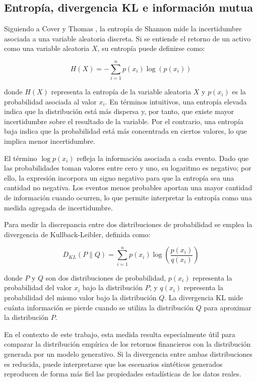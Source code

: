 \subsection{Entropía, divergencia KL e información mutua}

Siguiendo a Cover y Thomas \citeyear{cover2006elements}, la entropía de Shannon mide la incertidumbre asociada a una variable aleatoria discreta. Si se entiende el retorno de un activo como una variable aleatoria $X$, su entropía puede definirse como:

\begin{equation}
H(X) = - \sum_{i=1}^{n} p(x_i)\log\left(p(x_i)\right)
\end{equation}

donde $H(X)$ representa la entropía de la variable aleatoria $X$ y $p(x_i)$ es la probabilidad asociada al valor $x_i$. En términos intuitivos, una entropía elevada indica que la distribución está más dispersa y, por tanto, que existe mayor incertidumbre sobre el resultado de la variable. Por el contrario, una entropía baja indica que la probabilidad está más concentrada en ciertos valores, lo que implica menor incertidumbre.

El término $\log p(x_i)$ refleja la información asociada a cada evento. Dado que las probabilidades toman valores entre cero y uno, su logaritmo es negativo; por ello, la expresión incorpora un signo negativo para que la entropía sea una cantidad no negativa. Los eventos menos probables aportan una mayor cantidad de información cuando ocurren, lo que permite interpretar la entropía como una medida agregada de incertidumbre.

Para medir la discrepancia entre dos distribuciones de probabilidad se emplea la divergencia de Kullback-Leibler, definida como:

\begin{equation}
D_{KL}(P \parallel Q)
=
\sum_{i=1}^{n} p(x_i)
\log\left(
\frac{p(x_i)}{q(x_i)}
\right)
\end{equation}

donde $P$ y $Q$ son dos distribuciones de probabilidad, $p(x_i)$ representa la probabilidad del valor $x_i$ bajo la distribución $P$, y $q(x_i)$ representa la probabilidad del mismo valor bajo la distribución $Q$. La divergencia KL mide cuánta información se pierde cuando se utiliza la distribución $Q$ para aproximar la distribución $P$.

En el contexto de este trabajo, esta medida resulta especialmente útil para comparar la distribución empírica de los retornos financieros con la distribución generada por un modelo generativo. Si la divergencia entre ambas distribuciones es reducida, puede interpretarse que los escenarios sintéticos generados reproducen de forma más fiel las propiedades estadísticas de los datos reales.

